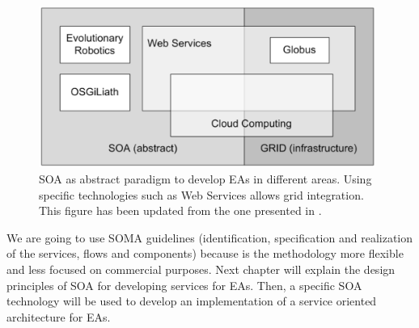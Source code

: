 \begin{figure}
\centering
\includegraphics[width=26pc]{gfx/soa/soagrid.png}
\caption{SOA as abstract paradigm to develop EAs in different
  areas. %
 Using specific technologies such as Web Services allows grid integration. This figure has been updated from the one presented in \cite{SOALIB}.}
\label{fig:soagrid}
\end{figure}
We are going to use SOMA guidelines (identification, specification and
realization of the services, flows and components) because is the
methodology more flexible and less focused on commercial
purposes. Next chapter will explain the design principles of SOA for
developing services for EAs. Then, a specific SOA technology will be
used to develop an implementation of a service oriented architecture
for EAs.
